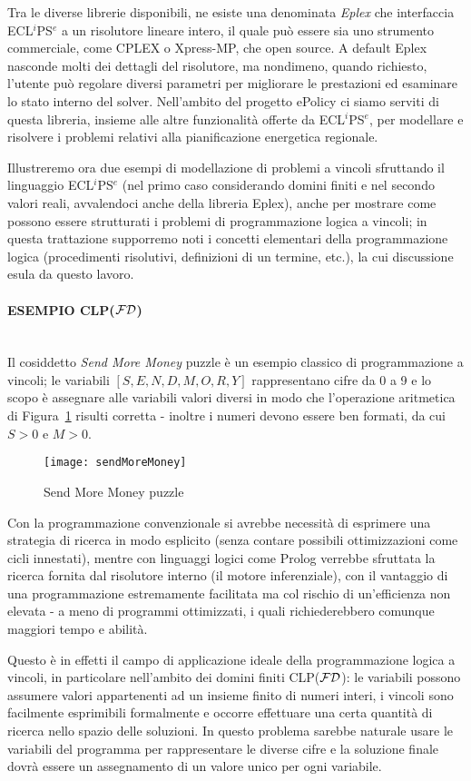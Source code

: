 \documentclass[12pt,a4paper,openright,twoside]{report}
\newcommand{\myparagraph}[1]{\paragraph{#1}\mbox{}\\}
\newcommand{\clpfd}{CLP({\ensuremath{\cal FD}})}
\begin{document}
Tra le diverse librerie disponibili, ne esiste una denominata \emph{Eplex} \cite{eplex} che interfaccia ECL$^i$PS$^e$ a un risolutore lineare intero, il quale può essere sia uno strumento commerciale, come CPLEX o Xpress-MP, che open source. A default Eplex nasconde molti dei dettagli del risolutore, ma nondimeno, quando richiesto, l'utente può regolare diversi parametri per migliorare le prestazioni ed esaminare lo stato interno del solver. Nell'ambito del progetto ePolicy ci siamo serviti di questa libreria, insieme alle altre funzionalità offerte da ECL$^i$PS$^e$, per modellare e risolvere i problemi relativi alla pianificazione energetica regionale.

Illustreremo ora due esempi di modellazione di problemi a vincoli sfruttando il linguaggio ECL$^i$PS$^e$ (nel primo caso considerando domini finiti e nel secondo valori reali, avvalendoci anche della libreria Eplex), anche per mostrare come possono essere strutturati i problemi di programmazione logica a vincoli; in questa trattazione supporremo noti i concetti elementari della programmazione logica (procedimenti risolutivi, definizioni di un termine, etc.), la cui discussione esula da questo lavoro.

\myparagraph{ESEMPIO \clpfd}
Il cosiddetto \emph{Send More Money} puzzle è un esempio classico di programmazione a vincoli; le variabili $[S,E,N,D,M,O,R,Y]$ rappresentano cifre da 0 a 9 e lo scopo è assegnare alle variabili valori diversi in modo che l'operazione aritmetica di Figura~\ref{SendMoreMoney} risulti corretta - inoltre i numeri devono essere ben formati, da cui $S>0$ e $M>0$. 

\begin{figure}[h]
	\centering
	\texttt{[image: sendMoreMoney]}
	\caption{Send More Money puzzle}
	\label{SendMoreMoney}
\end{figure}

Con la programmazione convenzionale si avrebbe necessità di esprimere una strategia di ricerca in modo esplicito (senza contare possibili ottimizzazioni come cicli innestati), mentre con linguaggi logici come Prolog verrebbe sfruttata la ricerca fornita dal risolutore interno (il motore inferenziale), con il vantaggio di una programmazione estremamente facilitata ma col rischio di un'efficienza non elevata - a meno di programmi ottimizzati, i quali richiederebbero comunque maggiori tempo e abilità. 

Questo è in effetti il campo di applicazione ideale della programmazione logica a vincoli, in particolare nell'ambito  dei domini finiti \clpfd: le variabili possono assumere valori appartenenti ad un insieme finito di numeri interi, i vincoli sono facilmente esprimibili formalmente e occorre effettuare una certa quantità di ricerca nello spazio delle soluzioni. In questo problema sarebbe naturale usare le variabili del programma per rappresentare le diverse cifre e la soluzione finale dovrà essere un assegnamento di un valore unico per ogni variabile. 
\end{document}

